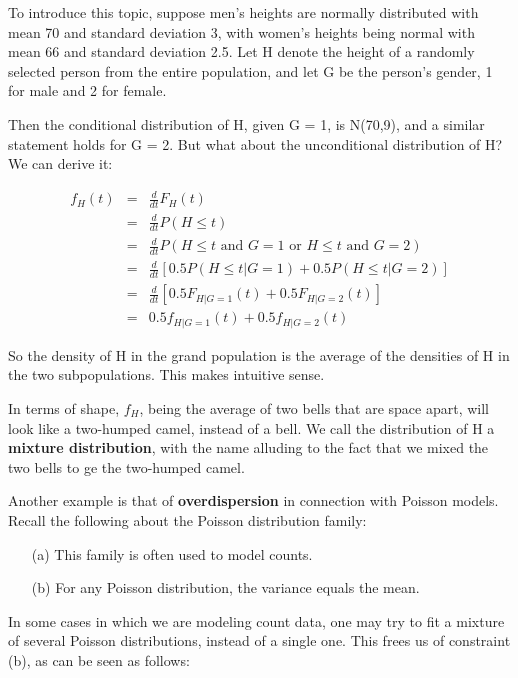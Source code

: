 To introduce this topic, suppose men's heights are normally distributed
with mean 70 and standard deviation 3, with women's heights being normal
with mean 66 and standard deviation 2.5.  Let H denote the height of a
randomly selected person from the entire population, and let G be the
person's gender, 1 for male and 2 for female.

Then the conditional distribution of H, given G = 1, is N(70,9), and a
similar statement holds for G = 2.  But what about the unconditional
distribution of H?  We can derive it:

\begin{eqnarray}
f_H(t) &=& \frac{d}{dt} F_H(t) \\ 
&=& \frac{d}{dt} P(H \leq t) \\
&=& \frac{d}{dt} P(H \leq t \textrm{ and } G = 1 \textrm{ or }
   H \leq t \textrm{ and } G = 2) \\
&=& \frac{d}{dt} 
   \left [
   0.5 P(H \leq t | G = 1) + 0.5 P(H \leq t | G = 2)
   \right ] \\
&=& \frac{d}{dt} 
\left [ 0.5 F_{H|G=1}(t) + 0.5 F_{H|G=2}(t) \right ] \\
&=& 
0.5 f_{H|G=1}(t) + 0.5 f_{H|G=2}(t) 
\end{eqnarray}

So the density of H in the grand population is the average of the
densities of H in the two subpopulations.  This makes intuitive sense.

In terms of shape, $f_H$, being the average of two bells that are space
apart, will look like a two-humped camel, instead of a bell.  We call
the distribution of H a {\bf mixture distribution}, with the name
alluding to the fact that we mixed the two bells to ge the two-humped
camel.

Another example is that of {\bf overdispersion} in connection with
Poisson models.  Recall the following about the Poisson distribution
family:

\begin{itemize}

\item [(a)] This family is often used to model counts.

\item [(b)] For any Poisson distribution, the variance equals the mean.

\end{itemize}

In some cases in which we are modeling count data, one may try to fit a
mixture of several Poisson distributions, instead of a single one.  This
frees us of constraint (b), as can be seen as follows:

